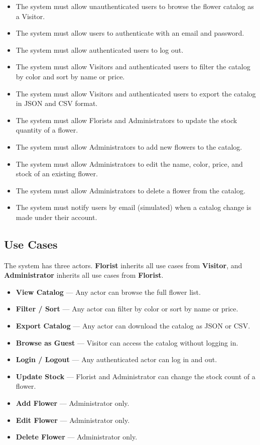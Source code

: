 \begin{itemize}
    \item The system must allow unauthenticated users to browse the flower catalog as a Visitor.
    \item The system must allow users to authenticate with an email and password.
    \item The system must allow authenticated users to log out.
    \item The system must allow Visitors and authenticated users to filter the catalog by color and sort by name or price.
    \item The system must allow Visitors and authenticated users to export the catalog in JSON and CSV format.
    \item The system must allow Florists and Administrators to update the stock quantity of a flower.
    \item The system must allow Administrators to add new flowers to the catalog.
    \item The system must allow Administrators to edit the name, color, price, and stock of an existing flower.
    \item The system must allow Administrators to delete a flower from the catalog.
    \item The system must notify users by email (simulated) when a catalog change is made under their account.
\end{itemize}

\subsection{Use Cases}

\par The system has three actors. \textbf{Florist} inherits all use cases from \textbf{Visitor}, and \textbf{Administrator} inherits all use cases from \textbf{Florist}.

\begin{itemize}
    \item \textbf{View Catalog} — Any actor can browse the full flower list.
    \item \textbf{Filter / Sort} — Any actor can filter by color or sort by name or price.
    \item \textbf{Export Catalog} — Any actor can download the catalog as JSON or CSV.
    \item \textbf{Browse as Guest} — Visitor can access the catalog without logging in.
    \item \textbf{Login / Logout} — Any authenticated actor can log in and out.
    \item \textbf{Update Stock} — Florist and Administrator can change the stock count of a flower.
    \item \textbf{Add Flower} — Administrator only.
    \item \textbf{Edit Flower} — Administrator only.
    \item \textbf{Delete Flower} — Administrator only.
\end{itemize}

